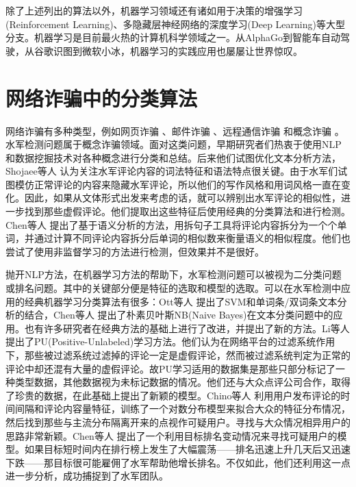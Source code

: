 除了上述列出的算法以外，机器学习领域还有诸如用于决策的增强学习(Reinforcement Learning)、多隐藏层神经网络的深度学习(Deep Learning)等大型分支。机器学习是目前最火热的计算机科学领域之一。从AlphaGo到智能车自动驾驶，从谷歌识图到微软小冰，机器学习的实践应用也屡屡让世界惊叹。



\section{网络诈骗中的分类算法}

网络诈骗有多种类型，例如网页诈骗 \cite{Spirin:2012}、邮件诈骗 \cite{Castillo:2007}、远程通信诈骗 \cite{Yao:2017}和概念诈骗 \cite{Jindal:2008}。水军检测问题属于概念诈骗领域。面对这类问题，早期研究者们热衷于使用NLP和数据挖掘技术对各种概念进行分类和总结。后来他们试图优化文本分析方法，Shojaee等人 \parencite{Shojaee:2013}认为关注水军评论内容的词法特征和语法特点很关键。由于水军们试图模仿正常评论的内容来隐藏水军评论，所以他们的写作风格和用词风格一直在变化。因此，如果从文体形式出发来考虑的话，就可以辨别出水军评论的相似性，进一步找到那些虚假评论。他们提取出这些特征后使用经典的分类算法和进行检测。Chen等人 \parencite{Chen:2013}提出了基于语义分析的方法，用拆句子工具将评论内容拆分为一个个单词，并通过计算不同评论内容拆分后单词的相似数来衡量语义的相似程度。他们也尝试了使用非监督学习的方法进行检测，但效果并不是很好。

抛开NLP方法，在机器学习方法的帮助下，水军检测问题可以被视为二分类问题或排名问题。其中的关键部分便是特征的选取和模型的选取。可以在水军检测中应用的经典机器学习分类算法有很多：Ott等人 \parencite{Ott:2011}提出了SVM和单词条/双词条文本分析的结合，Chen等人 \parencite{CHEN:2009}提出了朴素贝叶斯NB(Naive Bayes)在文本分类问题中的应用。也有许多研究者在经典方法的基础上进行了改进，并提出了新的方法。Li等人 \parencite{Li:2014}提出了PU(Positive-Unlabeled)学习方法。他们认为在网络平台的过滤系统作用下，那些被过滤系统过滤掉的评论一定是虚假评论，然而被过滤系统判定为正常的评论中却还混有大量的虚假评论。故PU学习适用的数据集是那些只部分标记了一种类型数据，其他数据视为未标记数据的情况。他们还与大众点评公司合作，取得了珍贵的数据，在此基础上提出了新颖的模型。Chino等人 \parencite{Chino:2017}利用用户发布评论的时间间隔和评论内容量特征，训练了一个对数分布模型来拟合大众的特征分布情况，然后找到那些与主流分布隔离开来的点视作可疑用户。寻找与大众情况相异用户的思路非常新颖。Chen等人 \parencite{Chen:2017}提出了一个利用目标排名变动情况来寻找可疑用户的模型。如果目标短时间内在排行榜上发生了大幅震荡——排名迅速上升几天后又迅速下跌——那目标很可能雇佣了水军帮助他增长排名。不仅如此，他们还利用这一点进一步分析，成功捕捉到了水军团队。





